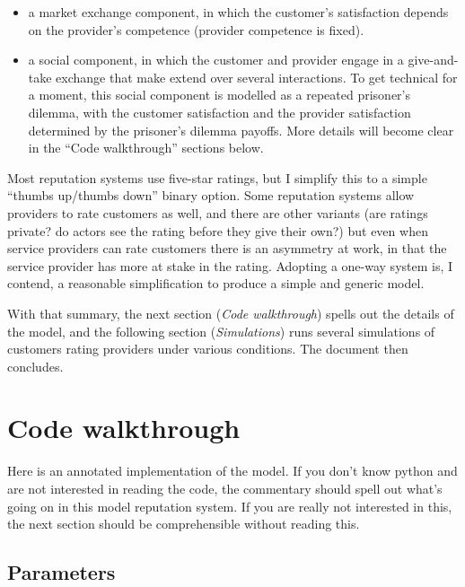 \documentclass[
  letterpaper,
  DIV=11,
  numbers=noendperiod]{scrartcl}
\providecommand{\tightlist}{%
  \setlength{\itemsep}{0pt}\setlength{\parskip}{0pt}}\usepackage{longtable,booktabs,array}
\begin{document}
\begin{itemize}
\tightlist
\item
  a market exchange component, in which the customer's satisfaction
  depends on the provider's competence (provider competence is fixed).
\item
  a social component, in which the customer and provider engage in a
  give-and-take exchange that make extend over several interactions. To
  get technical for a moment, this social component is modelled as a
  repeated prisoner's dilemma, with the customer satisfaction and the
  provider satisfaction determined by the prisoner's dilemma payoffs.
  More details will become clear in the ``Code walkthrough'' sections
  below.
\end{itemize}

Most reputation systems use five-star ratings, but I simplify this to a
simple ``thumbs up/thumbs down'' binary option. Some reputation systems
allow providers to rate customers as well, and there are other variants
(are ratings private? do actors see the rating before they give their
own?) but even when service providers can rate customers there is an
asymmetry at work, in that the service provider has more at stake in the
rating. Adopting a one-way system is, I contend, a reasonable
simplification to produce a simple and generic model.

With that summary, the next section (\emph{Code walkthrough}) spells out
the details of the model, and the following section (\emph{Simulations})
runs several simulations of customers rating providers under various
conditions. The document then concludes.

\hypertarget{code-walkthrough}{%
\section{Code walkthrough}\label{code-walkthrough}}

Here is an annotated implementation of the model. If you don't know
python and are not interested in reading the code, the commentary should
spell out what's going on in this model reputation system. If you are
really not interested in this, the next section should be comprehensible
without reading this.

\hypertarget{parameters}{%
\subsection{Parameters}\label{parameters}}
\end{document}
